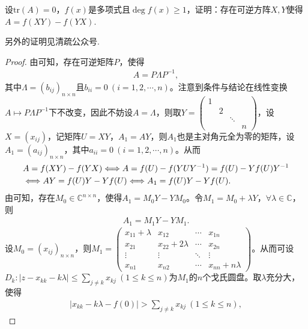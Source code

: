 \documentclass[../../main.tex]{subfiles}%
\begin{document}
\begin{proposition}
设$\mathrm{tr}(A)=0$，$f(x)$是多项式且$\deg f(x)\geqslant  1$，证明：存在可逆方阵$X,Y$使得$A = f(XY)-f(YX)$.
\end{proposition}
\begin{note}
另外的证明见清疏公众号.
\end{note}
\begin{proof}

由可知，存在可逆矩阵$P$，使得
\begin{align*}
A = P\Lambda P^{-1},
\end{align*}
其中$\Lambda = (b_{ij})_{n\times n}$且$b_{ii} = 0\ (i = 1,2,\cdots,n)$。注意到条件与结论在线性变换$A \mapsto P\Lambda P^{-1}$下不改变，因此不妨设$A = \Lambda$，则取$Y = \begin{pmatrix}
1 & & & \\
& 2 & & \\
& & \ddots & \\
& & & n
\end{pmatrix}$，设$X = (x_{ij})$，记矩阵$U = XY$，$A_1 = AY$，则$A_1$也是主对角元全为零的矩阵，设$A_1 = (a_{ij})_{n\times n}$，其中$a_{ii} = 0\ (i = 1,2,\cdots,n)$。从而
\begin{align}
&A = f(XY) - f(YX) \Longleftrightarrow A = f(U) - f(YUY^{-1}) = f(U) - Yf(U)Y^{-1} \notag \\
&\Longleftrightarrow AY = f(U)Y - Yf(U) \Longleftrightarrow A_1 = f(U)Y - Yf(U). \label{100.49}
\end{align}
由可知，存在$M_0 \in \mathbb{C}^{n\times n}$，使得$A_1 = M_0Y - YM_0$。令$M_1 = M_0 + \lambda Y$，$\forall \lambda \in \mathbb{C}$，则
\begin{align}
A_1 = M_1Y - YM_1. \label{100.48}
\end{align}
设$M_0 = (x_{ij})_{n\times n}$，则$M_1 = \begin{pmatrix}
x_{11} + \lambda & x_{12} & \cdots & x_{1n} \\
x_{21} & x_{22} + 2\lambda & \cdots & x_{2n} \\
\vdots & \vdots & \ddots & \vdots \\
x_{n1} & x_{n2} & \cdots & x_{nn} + n\lambda
\end{pmatrix}$。从而可设$D_k: |z - x_{kk} - k\lambda| \leqslant \sum_{j\ne k} x_{kj}\ (1 \leqslant k \leqslant n)$为$M_1$的$n$个戈氏圆盘。取$\lambda$充分大，使得
\begin{align}
|x_{kk} - k\lambda - f(0)| > \sum_{j\ne k} x_{kj}\ (1 \leqslant k \leqslant n), \label{100.46}

\end{align}
\end{proof}
\end{document}
